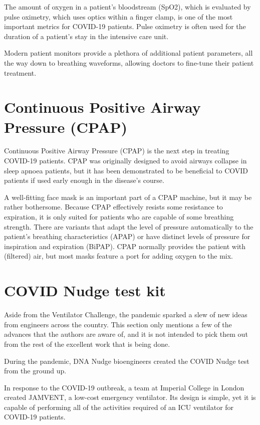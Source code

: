 \documentclass[15pt]{article}
\begin{document}
The amount of oxygen in a patient's bloodstream (SpO2), which is 
evaluated by pulse oximetry, which uses optics within a finger clamp, is one of the most important metrics for COVID-19 patients. Pulse oximetry is often used for the duration of a patient's stay in the  intensive care unit.

Modern patient monitors provide a plethora of additional patient 
parameters, all the way down to breathing waveforms, allowing 
doctors to fine-tune their patient treatment.


\section{Continuous Positive Airway Pressure (CPAP)}
Continuous Positive Airway Pressure (CPAP) is the next step in 
treating COVID-19 patients. CPAP was originally designed to avoid 
airways collapse in sleep apnoea patients, but it has been 
demonstrated to be beneficial to COVID patients if used early enough
in the disease's course.

A well-fitting face mask is an important part of a CPAP machine, but
it may be rather bothersome. Because CPAP effectively resists some 
resistance to expiration, it is only suited for patients who are 
capable of some breathing strength. There are variants that adapt the level of pressure automatically to the patient's breathing 
characteristics (APAP) or have distinct levels of pressure for 
inspiration and expiration (BiPAP). CPAP normally provides the 
patient with (filtered) air, but most masks feature a port for adding oxygen to the mix.

\section{COVID Nudge test kit}
Aside from the Ventilator Challenge, the pandemic sparked a slew of 
new ideas from engineers across the country. This section only 
mentions a few of the advances that the authors are aware of, and it
is not intended to pick them out from the rest of the excellent work
that is being done.

During the pandemic, DNA Nudge bioengineers created the COVID Nudge 
test from the ground up.

In response to the COVID-19 outbreak, a team at Imperial College in 
London created JAMVENT, a low-cost emergency ventilator. Its design 
is simple, yet it is capable of performing all of the activities 
required of an ICU ventilator for COVID-19 patients.
\end{document}
